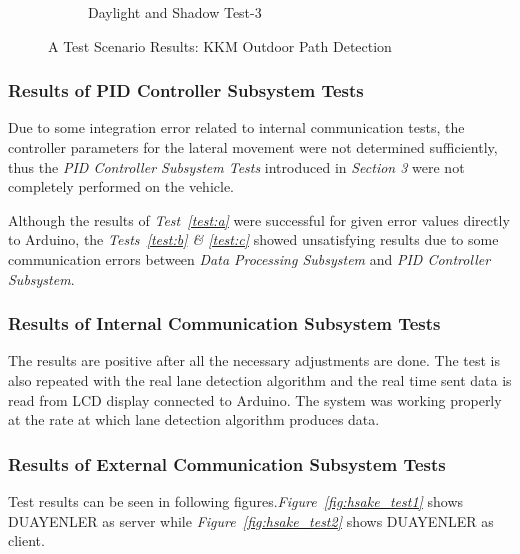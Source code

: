 \documentclass[a4paper,12pt]{article}
\begin{document}
\begin{figure}[H]
\begin{subfigure}{.31\textwidth}
\caption{\label{fig:dataP_outsideObs2} Daylight and Shadow Test-3}

\end{subfigure}

\caption{\label{fig:dataP_outside} A Test Scenario Results: KKM Outdoor Path Detection}

\end{figure}	



\subsubsection*{Results of PID Controller Subsystem Tests}


Due to some integration error related to internal communication tests, the controller parameters for the lateral movement were not determined sufficiently, thus the \textit{PID Controller Subsystem Tests} introduced in \textit{Section 3} were not completely performed on the vehicle. 


Although the results of \textit{Test~\ref{test:a}} were successful for given error values directly to Arduino, the \textit{Tests~\ref{test:b} \& \ref{test:c}} showed unsatisfying results due to some communication errors between \textit{Data Processing Subsystem} and \textit{PID Controller Subsystem}.



\subsubsection*{Results of Internal Communication Subsystem Tests}


The results are positive after all the necessary adjustments are done. The test is also repeated with the real lane detection algorithm and the real time sent data is read from LCD display connected to Arduino. The system was working properly at the rate at which lane detection algorithm produces data.






\subsubsection*{Results of External Communication Subsystem Tests}



Test results can be seen in following figures.\textit{Figure~\ref{fig:hsake_test1}} shows DUAYENLER as server while \textit{Figure~\ref{fig:hsake_test2}} shows DUAYENLER as client.
\end{document}
